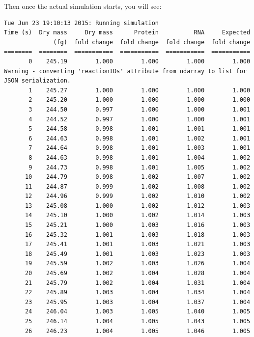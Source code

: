 \documentclass[12pt]{article}
\begin{document}
\hfill \break
\hfill \break



Then once the actual simulation starts, you will see:

\hfill \break
\hfill \break



\begin{lstlisting}
Tue Jun 23 19:10:13 2015: Running simulation
Time (s)  Dry mass     Dry mass      Protein          RNA     Expected
              (fg)  fold change  fold change  fold change  fold change
========  ========  ===========  ===========  ===========  ===========
       0    245.19        1.000        1.000        1.000        1.000
Warning - converting 'reactionIDs' attribute from ndarray to list for JSON serialization.
       1    245.27        1.000        1.000        1.000        1.000
       2    245.20        1.000        1.000        1.000        1.000
       3    244.50        0.997        1.000        1.000        1.001
       4    244.52        0.997        1.000        1.000        1.001
       5    244.58        0.998        1.001        1.001        1.001
       6    244.63        0.998        1.001        1.002        1.001
       7    244.64        0.998        1.001        1.003        1.001
       8    244.63        0.998        1.001        1.004        1.002
       9    244.73        0.998        1.001        1.005        1.002
      10    244.79        0.998        1.002        1.007        1.002
      11    244.87        0.999        1.002        1.008        1.002
      12    244.96        0.999        1.002        1.010        1.002
      13    245.08        1.000        1.002        1.012        1.003
      14    245.10        1.000        1.002        1.014        1.003
      15    245.21        1.000        1.003        1.016        1.003
      16    245.32        1.001        1.003        1.018        1.003
      17    245.41        1.001        1.003        1.021        1.003
      18    245.49        1.001        1.003        1.023        1.003
      19    245.59        1.002        1.003        1.026        1.004
      20    245.69        1.002        1.004        1.028        1.004
      21    245.79        1.002        1.004        1.031        1.004
      22    245.89        1.003        1.004        1.034        1.004
      23    245.95        1.003        1.004        1.037        1.004
      24    246.04        1.003        1.005        1.040        1.005
      25    246.14        1.004        1.005        1.043        1.005
      26    246.23        1.004        1.005        1.046        1.005

\end{lstlisting}
\end{document}
